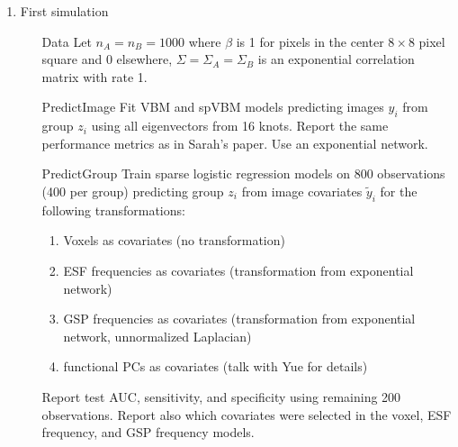 \documentclass[12pt]{article}
\begin{document}
\begin{enumerate}
	\item First simulation
	\begin{enumerate}
		\item[Data] Let $n_A=n_B=1000$ where $\beta$ is 1 for pixels in the center $8\times8$ pixel square and 0 elsewhere, $\Sigma=\Sigma_A=\Sigma_B$ is an exponential correlation matrix with rate 1. 
		\item[PredictImage] Fit VBM and spVBM models predicting images $y_i$ from group $z_i$ using all eigenvectors from 16 knots. Report the same performance metrics as in Sarah's paper. Use an exponential network.
		\item[PredictGroup] Train sparse logistic regression models on 800 observations (400 per group) predicting group $z_i$ from image covariates $\tilde y_i$ for the following transformations:
		\begin{enumerate}
			\item Voxels as covariates (no transformation)
			\item ESF frequencies as covariates (transformation from exponential network)
			\item GSP frequencies as covariates (transformation from exponential network, unnormalized Laplacian)
			\item functional PCs as covariates (talk with Yue for details)
		\end{enumerate}
		Report test AUC, sensitivity, and specificity using remaining 200 observations. Report also which covariates were selected in the voxel, ESF frequency, and GSP frequency models.
	\end{enumerate}
\end{enumerate}
\end{document}
